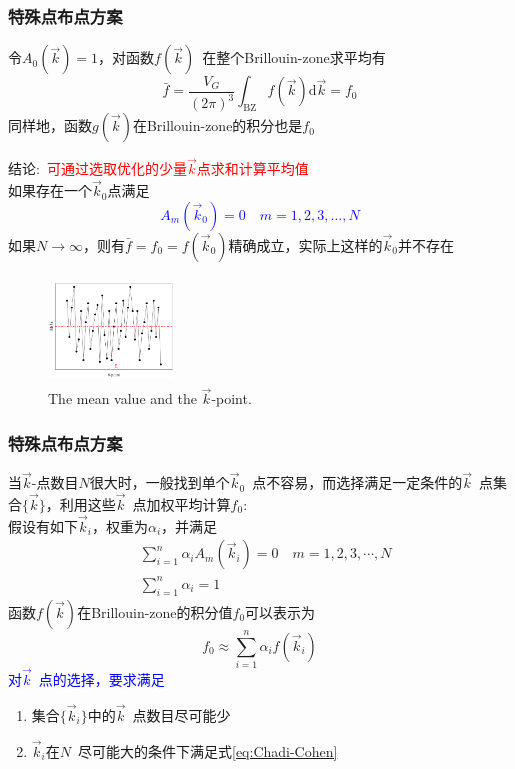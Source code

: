 \documentclass[cjk,slidestop,compress,mathserif,blue]{beamer}
\begin{document}
\frame
{
	\frametitle{特殊点布点方案}
	令$A_0(\vec k)=1$，对函数$f(\vec k)$~在整个\textrm{Brillouin-zone}求平均有
	$$\bar f=\dfrac{V_G}{(2\pi)^3}\int_{\mathrm{BZ}}f(\vec k)\mathrm{d}\vec k=f_0$$
	同样地，函数$g(\vec k)$在\textrm{Brillouin-zone}的积分也是$f_0$

	结论:~\textcolor{red}{可通过选取优化的少量$\vec k$点求和计算平均值}\\如果存在一个$\vec k_0$点满足\textcolor{blue}{
	$$A_m(\vec k_0)=0\quad m=1,2,3,\dots,N$$}
	如果$N\rightarrow\infty$，则有$\bar f=f_0=f(\vec k_0)$精确成立，实际上这样的$\vec k_0$并不存在
\begin{figure}[h!]
\centering
\vspace*{-0.2in}
\includegraphics[height=1.1in,width=1.3in,viewport=5 0 960 750,clip]{Figures/Brillouin-k.png}
\caption{\tiny \textrm{The mean value and the $\vec k$-point.}}%
\label{Brillouin-k}
\end{figure} 
}

\frame
{
	\frametitle{特殊点布点方案}
	当$\vec k$-点数目$N$很大时，一般找到单个$\vec k_0$~点不容易，而选择满足一定条件的$\vec k$~点集合$\{\vec k\}$，利用这些$\vec k$~点加权平均计算$f_0$:\\
	假设有如下$\vec k_i$，权重为$\alpha_i$，并满足
	\begin{equation}
		\begin{aligned}
			&\sum_{i=1}^n\alpha_iA_m(\vec k_i)=0\quad m=1,2,3,\cdots,N\\
			&\sum_{i=1}^n\alpha_i=1
		\end{aligned}
		\label{eq:Chadi-Cohen}
	\end{equation}
	函数$f(\vec k)$在\textrm{Brillouin-zone}的积分值$f_0$可以表示为$$f_0\approx\sum_{i=1}^n\alpha_if(\vec k_i)$$
	\textcolor{blue}{对$\vec k$~点的选择，要求满足}
	\begin{enumerate}
		\item 集合$\{\vec k_i\}$中的$\vec k$~点数目尽可能少
		\item $\vec k_i$在$N$~尽可能大的条件下满足式\eqref{eq:Chadi-Cohen}
	\end{enumerate}
}
\end{document}
